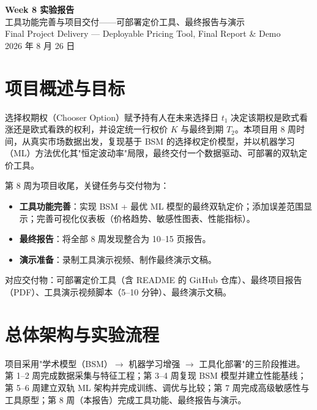 \documentclass[11pt,a4paper]{article}
\begin{document}
\begin{center}
{\LARGE\bfseries Week 8 实验报告}\\[0.3em]
{\large 工具功能完善与项目交付——可部署定价工具、最终报告与演示}\\[0.2em]
{\small Final Project Delivery --- Deployable Pricing Tool, Final Report \& Demo}\\[0.4em]
{\small 2026 年 8 月 26 日}
\end{center}

\section{项目概述与目标}

选择权期权（Chooser Option）赋予持有人在未来选择日 $t_1$ 决定该期权是欧式看涨还是欧式看跌的权利，并设定统一行权价 $K$ 与最终到期 $T_2$。本项目用 8 周时间，从真实市场数据出发，复现基于 BSM 的选择权定价模型，并以机器学习（ML）方法优化其"恒定波动率"局限，最终交付一个数据驱动、可部署的双轨定价工具。

第 8 周为项目收尾，关键任务与交付物为：

\begin{itemize}
  \item \textbf{工具功能完善}：实现 BSM + 最优 ML 模型的最终双轨定价；添加误差范围显示；完善可视化仪表板（价格趋势、敏感性图表、性能指标）。
  \item \textbf{最终报告}：将全部 8 周发现整合为 10--15 页报告。
  \item \textbf{演示准备}：录制工具演示视频、制作最终演示文稿。
\end{itemize}

对应交付物：可部署定价工具（含 README 的 GitHub 仓库）、最终项目报告（PDF）、工具演示视频脚本（5--10 分钟）、最终演示文稿。

\section{总体架构与实验流程}

项目采用"学术模型（BSM）$\to$ 机器学习增强 $\to$ 工具化部署"的三阶段推进。第 1--2 周完成数据采集与特征工程；第 3--4 周复现 BSM 模型并建立性能基线；第 5--6 周建立双轨 ML 架构并完成训练、调优与比较；第 7 周完成高级敏感性与工具原型；第 8 周（本报告）完成工具功能、最终报告与演示。
\end{document}
